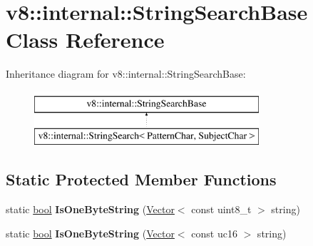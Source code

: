 \hypertarget{classv8_1_1internal_1_1StringSearchBase}{}\section{v8\+:\+:internal\+:\+:String\+Search\+Base Class Reference}
\label{classv8_1_1internal_1_1StringSearchBase}
Inheritance diagram for v8\+:\+:internal\+:\+:String\+Search\+Base\+:\begin{figure}[H]
\begin{center}
\leavevmode
\includegraphics[height=2.000000cm]{classv8_1_1internal_1_1StringSearchBase}
\end{center}
\end{figure}
\subsection*{Static Protected Member Functions}
\begin{DoxyCompactItemize}
\item 
\mbox{\label{classv8_1_1internal_1_1StringSearchBase_afd945987a48941b841edfd8e6f5c47a8}} 
static \mbox{\hyperlink{classbool}{bool}} {\bfseries Is\+One\+Byte\+String} (\mbox{\hyperlink{classv8_1_1internal_1_1Vector}{Vector}}$<$ const uint8\+\_\+t $>$ string)
\item 
\mbox{\label{classv8_1_1internal_1_1StringSearchBase_afe268149123840e06458df33d10bfafc}} 
static \mbox{\hyperlink{classbool}{bool}} {\bfseries Is\+One\+Byte\+String} (\mbox{\hyperlink{classv8_1_1internal_1_1Vector}{Vector}}$<$ const uc16 $>$ string)
\end{DoxyCompactItemize}
